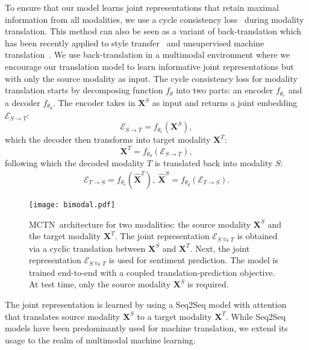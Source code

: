\documentclass[letterpaper]{article} %
\newcommand{\citep}{\cite}
\newcommand{\ours}{MCTN}
\begin{document}
To ensure that our model learns joint representations that retain maximal information from all modalities, we use a cycle consistency loss~\citep{DBLP:journals/corr/ZhuPIE17} during modality translation. This method can also be seen as a variant of back-translation which has been recently applied to style transfer~\citep{DBLP:journals/corr/abs-1804-09000,DBLP:journals/corr/ZhuPIE17} and unsupervised machine translation~\citep{DBLP:journals/corr/abs-1804-07755}. We use back-translation in a multimodal environment where we encourage our translation model to learn informative joint representations but with only the source modality as input. The cycle consistency loss for modality translation starts by decomposing function $f_{\theta}$ into two parts: an encoder $f_{\theta_e}$ and a decoder $f_{\theta_d}$. The encoder takes in $\mathbf{X}^{S}$ as input and returns a joint embedding $\mathcal{E}_{S \rightarrow T}$:
\begin{equation}
\mathcal{E}_{S \rightarrow T} = f_{\theta_e} (\mathbf{X}^{S}),
\end{equation}
which the decoder then transforms into target modality $\mathbf{X}^{T}$:
\begin{equation}
\mathbf{X}^{T} = f_{\theta_d} (\mathcal{E}_{S \rightarrow T}),
\end{equation}
following which the decoded modality $T$ is translated back into modality $S$:
\begin{align}{\mathcal{E}}_{T \rightarrow S} = f_{\theta_e}(\hat{\mathbf{X}}^{T}_{}), \ \hat{\mathbf{X}}^{S}_{} = f_{\theta_d} ({\mathcal{E}}_{T \rightarrow S}).
\end{align}

\begin{figure}[tbp]
\centering
\texttt{[image: bimodal.pdf]}
\caption{
\small
{
\ours \ architecture for two modalities: the source modality $\mathbf{X}^{S}$ and the target modality $\mathbf{X}^{T}$. The joint representation ${\mathcal{E}}_{S \leftrightarrows T}$ is obtained via a cyclic translation between $\mathbf{X}^{S}$ and $\mathbf{X}^{T}$. Next, the joint representation ${\mathcal{E}}_{S \leftrightarrows T}$ is used for sentiment prediction. The model is trained end-to-end with a coupled translation-prediction objective. At test time, only the source modality $\mathbf{X}^{S}$ is required.}
}
\label{fig:s2s}
\end{figure}

The joint representation is learned by using a Seq2Seq model with attention~\citep{bahdanau2014neural} 
that translates source modality $\mathbf{X}^{S}$ to a target modality $\mathbf{X}^{T}$. While Seq2Seq models have been predominantly used for machine translation, we extend its usage to the realm of multimodal machine learning.
\end{document}
